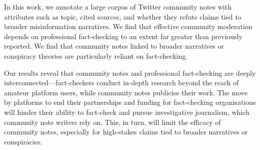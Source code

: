 In this work, we annotate a large corpus of Twitter community notes with attributes such as topic, cited sources, and whether they refute claims tied to broader misinformation narratives. We find that effective community moderation depends on professional fact-checking to an extent far greater than previously reported. We find that community notes linked to broader narratives or conspiracy theories are particularly reliant on fact-checking.

Our results reveal that community notes and professional fact-checking are deeply interconnected—fact-checkers conduct in-depth research beyond the reach of amateur platform users, while community notes publicise their work. The move by platforms to end their partnerships and funding for fact-checking organisations will hinder their ability to fact-check and pursue investigative journalism, which community note writers rely on. This, in turn, will limit the efficacy of community notes, especially for high-stakes claims tied to broader narratives or conspiracies.

